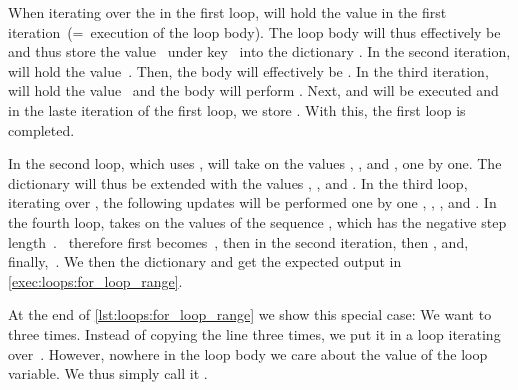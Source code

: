 When iterating over the  in the first loop,  will hold the value  in the first iteration~(=~execution of the loop body).
The loop body  will thus effectively be  and thus store the value~ under key~ into the dictionary .
In the second iteration,  will hold the value~.
Then, the body  will effectively be .
In the third iteration,  will hold the value~ and the body will perform .
Next,  and  will be executed and in the laste iteration of the first loop, we store .
With this, the first loop is completed.%
%
\begin{sloppypar}%
In the second loop, which uses ,  will take on the values , , and , one by one.
The dictionary  will thus be extended with the values , , and .
In the third loop, iterating over , the following updates will be performed one by one , , , and .
In the fourth loop,  takes on the values of the sequence , which has the negative step length~.
~therefore first becomes~, then  in the second iteration, then , and, finally,~.
We then  the dictionary and get the expected output in \cref{exec:loops:for_loop_range}.%
\end{sloppypar}%
%
%
%
At the end of \cref{lst:loops:for_loop_range} we show this special case:
We want to   three times.
Instead of copying the line  three times, we put it in a loop iterating over~.
However, nowhere in the loop body we care about the value of the loop variable.
We thus simply call it \pythonil{_}\pythonIdx{\_}.

